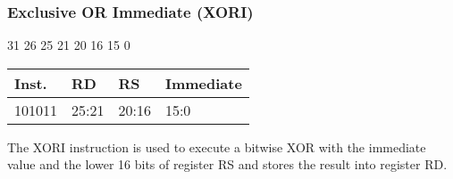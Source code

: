 \documentclass[12pt]{article}
\begin{document}

    \newpage
    \subsubsection{Exclusive OR Immediate (XORI)}
    
    \hspace{1.6cm}31 \hspace{1.15cm}26 \hspace{.05cm}25 \hspace{.8cm}21 \hspace{.05cm}20 \hspace{.8cm}16 \hspace{.05cm}15 \hspace{6.4cm}0
    \vspace{-.25cm}
    \begin{center}
        \begin{tabular}{ |p{1.8cm}|p{1.5cm}|p{1.5cm}|p{6.8cm}| }
            \hline
            \textbf{Inst.} & \textbf{RD} &  \textbf{RS} & \textbf{Immediate}\\
            \hline
            101011& 25:21 & 20:16 &15:0\\
            \hline
        \end{tabular}
    \end{center}
    
    \noindent
    The XORI instruction is used to execute a bitwise XOR with the immediate value and the lower 16 bits of register RS and stores the result into register RD. 
    
\end{document}

